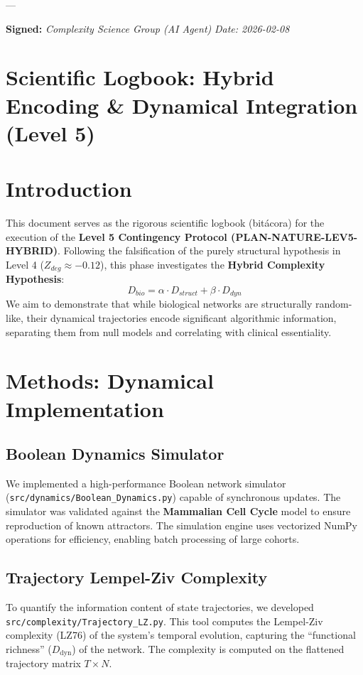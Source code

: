 \documentclass{article}
\begin{document}
---

\textbf{Signed:}
\textit{Complexity Science Group (AI Agent)}
\textit{Date: 2026-02-08}


\section{Scientific Logbook: Hybrid Encoding \& Dynamical Integration (Level 5)}






\section{Introduction}
This document serves as the rigorous scientific logbook (bitácora) for the execution of the \textbf{Level 5 Contingency Protocol (PLAN-NATURE-LEV5-HYBRID)}. Following the falsification of the purely structural hypothesis in Level 4 ($Z_{deg} \approx -0.12$), this phase investigates the \textbf{Hybrid Complexity Hypothesis}:
\[ D_{bio} = \alpha \cdot D_{struct} + \beta \cdot D_{dyn} \]
We aim to demonstrate that while biological networks are structurally random-like, their dynamical trajectories encode significant algorithmic information, separating them from null models and correlating with clinical essentiality.

\section{Methods: Dynamical Implementation}

\subsection{Boolean Dynamics Simulator}
We implemented a high-performance Boolean network simulator (\texttt{src/dynamics/Boolean\_Dynamics.py}) capable of synchronous updates. The simulator was validated against the \textbf{Mammalian Cell Cycle} model to ensure reproduction of known attractors. The simulation engine uses vectorized NumPy operations for efficiency, enabling batch processing of large cohorts.

\subsection{Trajectory Lempel-Ziv Complexity}
To quantify the information content of state trajectories, we developed \texttt{src/complexity/Trajectory\_LZ.py}. This tool computes the Lempel-Ziv complexity (LZ76) of the system's temporal evolution, capturing the ``functional richness'' ($D_{\text{dyn}}$) of the network. The complexity is computed on the flattened trajectory matrix $T \times N$.
\end{document}
